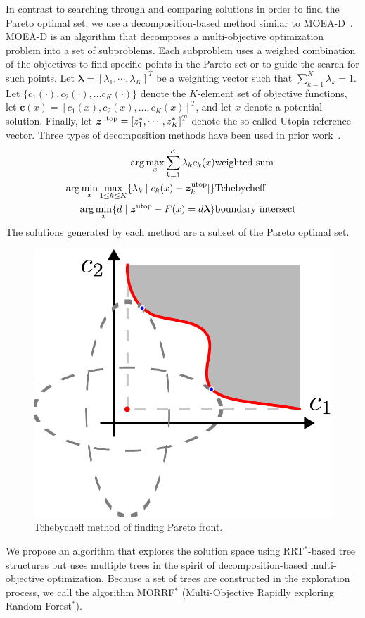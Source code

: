 \documentclass[phd]{byuprop}
\begin{document}
In contrast to searching through and comparing solutions in order to find the Pareto optimal set, we use a decomposition-based method similar to MOEA-D~\cite{Zhang2007}.  
MOEA-D is an algorithm that decomposes a multi-objective optimization problem into a set of subproblems.  
Each subproblem uses a weighed combination of the objectives to find specific points in the Pareto set or to guide the search for such points.  
Let $ \bm{\lambda} = [ \lambda_{1} , \cdots , \lambda_{K}  ]^{T} $ be a weighting vector such that $ \sum_{k=1}^{K} \lambda_{k} = 1 $.  
Let $\{c_{1}(\cdot), c_{2}(\cdot), \ldots c_{K}(\cdot)\}$ denote the $K$-element set of objective functions, let $\bm{c}(x) = [c_{1}(x), c_{2}(x), \ldots, c_{K}(x)]^T$, and let $x$ denote a potential solution.  
Finally, let $ \bm{z}^{\rm utop} = [z^{*}_{1}, \cdots , z^{*}_{K}]^{T} $ denote the so-called Utopia reference vector. %
Three types of decomposition methods have been used in prior work~\cite{Zhang2007}.
\begin{eqnarray}
\arg\max_x \sum_{k=1}^{K} \lambda_{k} c_{k} (x) & {\rm weighted \ sum} \label{eq:weighted}\\
\arg\min_x\max_{1 \leq k \leq K}  \{ \lambda_{k} \mid c_{k}(x) - \bm{z}^{\rm utop}_{k}  | \} & {\rm Tchebycheff} \label{eq:Tchebycheff}\\
\arg\min_x \{ d \mid \bm{z}^{\rm utop} - F(x) = d \bm{\lambda} \} & {\rm boundary \ intersect\ } \label{eq:boundary}
\end{eqnarray}
The solutions generated by each method are a subset of the Pareto optimal set.

\begin{figure}[htbp]
	\centering
	\includegraphics[width=0.3\linewidth]{fig/Tchebycheff}
	\caption{Tchebycheff method of finding Pareto front.}
	\label{fig:Tchebycheff}
\end{figure}

We propose an algorithm that explores the solution space using RRT$^{*}$-based tree structures but uses multiple trees in the spirit of decomposition-based multi-objective optimization.
Because a set of trees are constructed in the exploration process, we call the algorithm MORRF$^{*}$ (Multi-Objective Rapidly exploring Random Forest$^{*}$).
\end{document}
